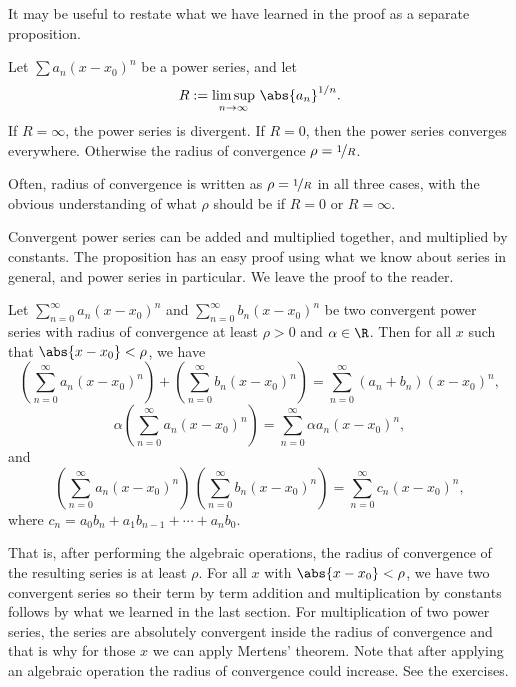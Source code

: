 \documentclass[12pt]{book}
\begin{document}
It may be useful to restate what we have learned in the proof
as a separate proposition.

\begin{prop}
Let $\sum a_n {(x-x_0)}^n$ be a power series, and let
\begin{equation*}
R := \limsup_{n\to\infty} \, {\abs{a_n}}^{1/n} .
\end{equation*}
If $R = \infty$, the power series is divergent.
If
$R=0$, then the power series converges everywhere.
 Otherwise
the radius of convergence $\rho = \nicefrac{1}{R}$.
\end{prop}

Often, radius of convergence is written as $\rho = \nicefrac{1}{R}$ in all
three cases, with
the obvious understanding of what $\rho$ should be if $R = 0$ or $R =
\infty$.

Convergent power series can be added and multiplied together, and multiplied
by constants.
The proposition has an easy proof using what we know about series
in general, and power series in particular.
We leave the proof to the reader.

\begin{prop}
Let $\sum_{n=0}^\infty a_n {(x-x_0)}^n$ and
$\sum_{n=0}^\infty b_n {(x-x_0)}^n$ be two convergent power series
with radius of convergence at least $\rho > 0$ and $\alpha \in \R$.
Then
for all $x$ such that $\abs{x-x_0} < \rho$, we have 
\begin{equation*}
\left(\sum_{n=0}^\infty a_n {(x-x_0)}^n\right)
+
\left(\sum_{n=0}^\infty b_n {(x-x_0)}^n\right)
=
\sum_{n=0}^\infty (a_n+b_n) {(x-x_0)}^n ,
\end{equation*}
\begin{equation*}
\alpha
\left(\sum_{n=0}^\infty a_n {(x-x_0)}^n\right)
=
\sum_{n=0}^\infty \alpha a_n {(x-x_0)}^n ,
\end{equation*}
and
\begin{equation*}
\left(\sum_{n=0}^\infty a_n {(x-x_0)}^n\right)
\,
\left(\sum_{n=0}^\infty b_n {(x-x_0)}^n\right)
=
\sum_{n=0}^\infty c_n {(x-x_0)}^n ,
\end{equation*}
where
$c_n = a_0b_n + a_1 b_{n-1} + \cdots + a_n b_0$.
\end{prop}

That is, after performing the algebraic operations, the
radius of convergence of the resulting series is at least $\rho$.
For all $x$ with $\abs{x-x_0} < \rho$, we have two convergent series so
their term by term addition and multiplication by constants
follows by what we learned in the last section.
For multiplication of two power series,
the series are absolutely convergent inside
the radius of convergence and that is why for those $x$
we can apply Mertens' theorem.
Note that after applying an algebraic operation the radius of convergence
could increase.
See the exercises.
\end{document}
